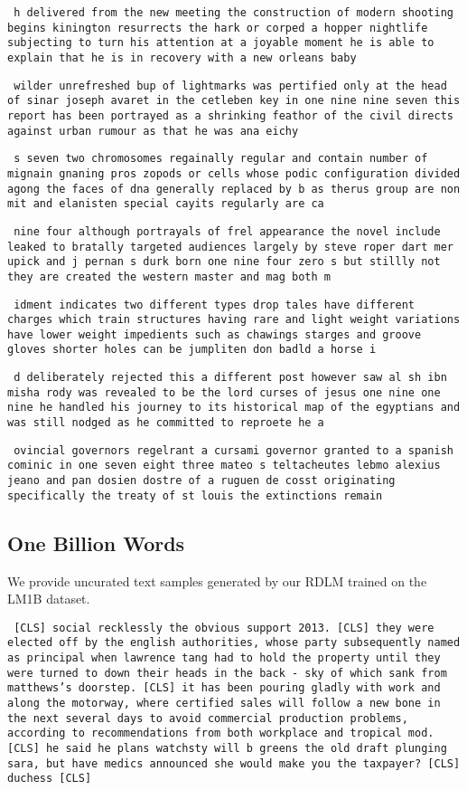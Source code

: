 \texttt{
    h delivered from the new meeting the construction of modern shooting begins kinington resurrects the hark or corped a hopper nightlife subjecting to turn his attention at a joyable moment he is able to explain that he is in recovery with a new orleans baby
}

\texttt{
    wilder unrefreshed bup of lightmarks was pertified only at the head of sinar joseph avaret in the cetleben key in one nine nine seven this report has been portrayed as a shrinking feathor of the civil directs against urban rumour as that he was ana eichy 
}

\texttt{
    s seven two chromosomes regainally regular and contain number of mignain gnaning pros zopods or cells whose podic configuration divided agong the faces of dna generally replaced by b as therus group are non mit and elanisten special cayits regularly are ca
}

\texttt{
     nine four although portrayals of frel appearance the novel include leaked to bratally targeted audiences largely by steve roper dart mer upick and j pernan s durk born one nine four zero s but stillly not they are created the western master and mag both m
}

\texttt{
    idment indicates two different types drop tales have different charges which train structures having rare and light weight variations have lower weight impedients such as chawings starges and groove gloves shorter holes can be jumpliten don badld a horse i
}

\texttt{
    d deliberately rejected this a different post however saw al sh ibn misha rody was revealed to be the lord curses of jesus one nine one nine he handled his journey to its historical map of the egyptians and was still nodged as he committed to reproete he a
}

\texttt{
    ovincial governors regelrant a cursami governor granted to a spanish cominic in one seven eight three mateo s teltacheutes lebmo alexius jeano and pan dosien dostre of a ruguen de cosst originating specifically the treaty of st louis the extinctions remain
}


\subsection{One Billion Words} \label{app:samples:lm1b}

We provide uncurated text samples generated by our RDLM trained on the LM1B dataset. 


\texttt{
    [CLS] social recklessly the obvious support 2013. [CLS] they were elected off by the english authorities, whose party subsequently named as principal when lawrence tang had to hold the property until they were turned to down their heads in the back - sky of which sank from matthews's doorstep. [CLS] it has been pouring gladly with work and along the motorway, where certified sales will follow a new bone in the next several days to avoid commercial production problems, according to recommendations from both workplace and tropical mod. [CLS] he said he plans watchsty will b greens the old draft plunging sara, but have medics announced she would make you the taxpayer? [CLS] duchess [CLS]
}


